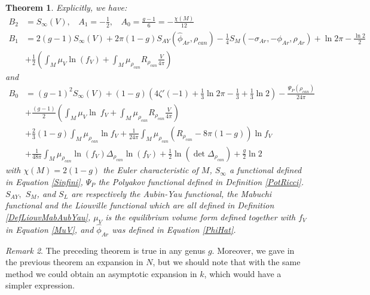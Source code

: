 \documentclass{article}
\newtheorem{theorem}{Theorem}[section]
\theoremstyle{definition}
\theoremstyle{remark}
\newtheorem{Remark}[theorem]{Remark}
\begin{document}
\begin{theorem}
Explicitly, we have: 
\begin{align*}
    B_{2}&=S_{\infty}(V),~~~~  A_{1}=-\frac{1}{2}, ~~~~ A_{0}=\frac{g-1}{6}=-\frac{\chi(M)}{12} \\B_{1}&=2(g-1)S_{\infty}(V)+2\pi(1-g)S_{AY}(\hat{\phi}_{Ar},\rho_{can})-\frac{1}{4}S_{M}(-\sigma_{Ar},-\phi_{Ar},\rho_{Ar})+\ln2\pi-\frac{\ln2}{2}\\&+\frac{1}{2}\left(\int_{M}\mu_{V}\ln\left(f_{V} \right)+\int_{M}\mu_{\rho_{can}}R_{\rho_{can}}\frac{V}{4\pi} \right) 
    \end{align*}
    and
    \begin{align*}
        B_{0}&=(g-1)^{2}S_{\infty}(V)+ (1-g)\left(4\zeta'(-1)+\frac{1}{3}\ln2\pi-\frac{1}{3}+\frac{1}{3}\ln2\right)-\frac{\Psi_{P}(\rho_{can})}{24\pi} \\[1.7mm]&+\frac{(g-1)}{2}\left(\int_{M}\mu_{V}\ln\ f_{V}+\int_{M}\mu_{\rho_{can}}R_{\rho_{can}}\frac{V}{4\pi} \right) \\[1.7mm]&+\frac{2}{3}(1-g)\int_{M}\mu_{\rho_{can}}\ln f_{V} +\frac{1}{24\pi}\int_{M}\mu_{\rho_{can}}\left(R_{\rho_{can}}-8\pi(1-g) \right)\ln f_{V}\\[1.7mm]&+\frac{1}{48\pi}\int_{M}\mu_{\rho_{can}}\ln (f_{V})\Delta_{\rho_{can}}\ln \left(f_{V} \right)+\frac{1}{2}\ln \left(\det\Delta_{\rho_{can}}\right)+\frac{g}{2}\ln2
    \end{align*}
with $\chi(M)=2(1-g)$ the Euler characteristic of $M$, $S_{\infty}$ a functional defined in Equation \eqref{Sinfini}, $\Psi_{P}$ the Polyakov functional defined in Definition \ref{PotRicci}. $S_{AY},$ $S_{M}$, and $S_{L}$ are respectively the Aubin-Yau functional, the Mabuchi functional and the Liouville functional which are all defined in Definition \ref{DefLiouvMabAubYau}, $\mu_{V}$ is the equilibrium volume form defined together with $f_{V}$ in Equation \eqref{MuV}, and $\hat{\phi}_{Ar}$ was defined in Equation \eqref{PhiHat}.
\end{theorem}
\begin{Remark}
    The preceding theorem is true in any genus $g.$ Moreover, we gave in the previous theorem an expansion in $N$, but we should note that with the same method we could obtain an asymptotic expansion in $k$, which would have a simpler expression.
\end{Remark}
\end{document}
